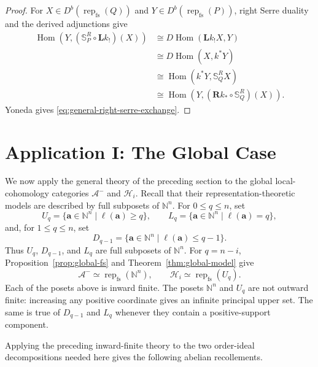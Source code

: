 \documentclass[12pt,reqno]{amsart}
\theoremstyle{definition}
\theoremstyle{remark}
\newcommand{\Rep}{\operatorname{rep}}
\newcommand{\Hom}{\operatorname{Hom}}
\begin{document}
\begin{proof}
For $X\in D^b(\Rep_{\mathrm{fs}}(Q))$ and
$Y\in D^b(\Rep_{\mathrm{fs}}(P))$, right Serre duality and the derived
adjunctions give
\begin{align*}
\Hom(Y,(\mathbb S_P^R\circ\mathbf Lk_!)(X))
&\cong D\Hom(\mathbf Lk_!X,Y)\\
&\cong D\Hom(X,k^*Y)\\
&\cong\Hom(k^*Y,\mathbb S_Q^R X)\\
&\cong\Hom(Y,(\mathbf Rk_*\circ\mathbb S_Q^R)(X)).
\end{align*}
Yoneda gives \eqref{eq:general-right-serre-exchange}.
\end{proof}

\section{Application I: The Global Case}\label{sec:global-recollement-serre}

We now apply the general theory of the preceding section to the global
local-cohomology categories $\mathcal A^-$ and $\mathcal H_i$.  Recall that
their representation-theoretic models are described by full subposets of
$\mathbb N^n$.  For $0\le q\le n$, set
\[
U_q=\{\mathbf a\in\mathbb N^n\mid\ell(\mathbf a)\ge q\},
\qquad
L_q=\{\mathbf a\in\mathbb N^n\mid\ell(\mathbf a)=q\},
\]
and, for $1\le q\le n$, set
\[
D_{q-1}=\{\mathbf a\in\mathbb N^n\mid\ell(\mathbf a)\le q-1\}.
\]
Thus $U_q$, $D_{q-1}$, and $L_q$ are full subposets of $\mathbb N^n$.  For
$q=n-i$, Proposition~\ref{prop:global-fs} and
Theorem~\ref{thm:global-model} give
\[
\mathcal A^-\simeq\Rep_{\mathrm{fs}}(\mathbb N^n),
\qquad
\mathcal H_i\simeq\Rep_{\mathrm{fs}}(U_q).
\]
Each of the posets above is inward finite.  The posets $\mathbb N^n$ and $U_q$
are not outward finite: increasing any positive coordinate gives an infinite
principal upper set.  The same is true of $D_{q-1}$ and $L_q$ whenever they
contain a positive-support component.

Applying the preceding inward-finite theory to the two order-ideal
decompositions needed here gives the following abelian recollements.
\end{document}
